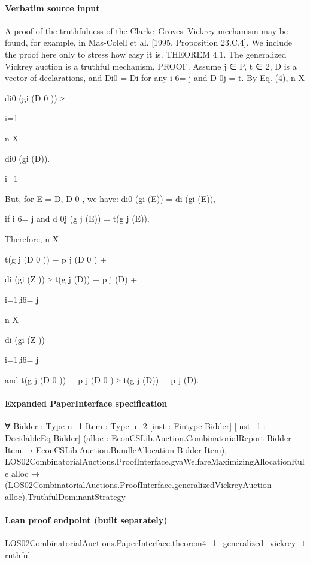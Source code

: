 \documentclass[10pt]{article}
\begin{document}
\paragraph{Verbatim source input}
\begin{ReviewVerbatim}
A proof of the truthfulness of the Clarke–Groves–Vickrey mechanism may be
found, for example, in Mas-Colell et al. [1995, Proposition 23.C.4]. We include the
proof here only to stress how easy it is.
THEOREM 4.1. The generalized Vickrey auction is a truthful mechanism.
PROOF. Assume j ∈ P, t ∈ 2, D is a vector of declarations, and Di0 = Di for
any i 6= j and D 0j = t. By Eq. (4),
n
X

di0 (gi (D 0 )) ≥

i=1

n
X

di0 (gi (D)).

i=1

But, for E = D, D 0 , we have:
di0 (gi (E)) = di (gi (E)),

if i 6= j and d 0j (g j (E)) = t(g j (E)).

Therefore,
n
X

t(g j (D 0 )) − p j (D 0 ) +

di (gi (Z )) ≥ t(g j (D)) − p j (D) +

i=1,i6= j

n
X

di (gi (Z ))

i=1,i6= j

and t(g j (D 0 )) − p j (D 0 ) ≥ t(g j (D)) − p j (D).
\end{ReviewVerbatim}


\paragraph{Expanded PaperInterface specification}
\begin{ReviewVerbatim}
∀ {Bidder : Type u_1} {Item : Type u_2} [inst : Fintype Bidder] [inst_1 : DecidableEq Bidder]
  (alloc : EconCSLib.Auction.CombinatorialReport Bidder Item → EconCSLib.Auction.BundleAllocation Bidder Item),
  LOS02CombinatorialAuctions.ProofInterface.gvaWelfareMaximizingAllocationRule alloc →
    (LOS02CombinatorialAuctions.ProofInterface.generalizedVickreyAuction alloc).TruthfulDominantStrategy
\end{ReviewVerbatim}

\paragraph{Lean proof endpoint (built separately)}\begin{ReviewVerbatim}
LOS02CombinatorialAuctions.PaperInterface.theorem4_1_generalized_vickrey_truthful
\end{ReviewVerbatim}
\end{document}
